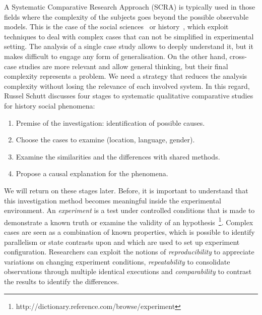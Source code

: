 A Systematic Comparative Research Approach (SCRA) is typically used in those fields where the complexity of the subjects goes beyond the possible observable models. This is the case of the social sciences~\cite{felsenstein1985phylogenies} or history~\cite{CSS:4411600}, which exploit techniques to deal with complex cases that can not be simplified in experimental setting. The analysis of a single case study allows to deeply understand it, but it makes difficult to engage any form of generalisation. On the other hand, cross-case studies are more relevant and allow general thinking, but their final complexity represents a problem. We need a strategy that reduces the analysis complexity without losing the relevance of each involved system. In this regard, Russel Schutt discusses four stages to systematic qualitative comparative studies for history social phenomena:
\begin{enumerate}
\item[S.1] Premise of the investigation: identification of possible causes.
\item[S.2] Choose the cases to examine (location, language, gender).
\item[S.3] Examine the similarities and the differences with shared methods.
\item[S.4] Propose a causal explanation for the phenomena.
\end{enumerate}

We will return on these stages later. Before, it is important to understand that this investigation method becomes meaningful inside the experimental environment. An \textit{experiment} is a test under controlled conditions that is made to demonstrate a known truth or examine the validity of an hypothesis~\footnote{http://dictionary.reference.com/browse/experiment}. Complex cases are seen as a combination of known properties, which is possible to identify parallelism or state contrasts upon and which are used to set up experiment configuration. Researchers can exploit the notions of \textit{reproducibility} to appreciate variations on changing experiment conditions, \textit{repeatability} to consolidate observations through multiple identical executions and \textit{comparability} to contrast the results to identify the differences.

